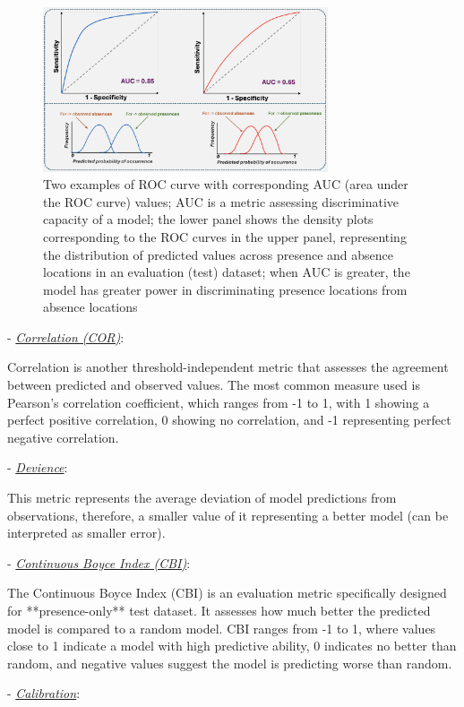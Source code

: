 \documentclass[
]{article}
\begin{document}
\begin{mdframed}[backgroundcolor=gray!10, linecolor=black!75, linewidth=2pt, roundcorner=5pt, shadow=true,frametitle={\textbf{BOX 2: \uline{Model evaluations for SDMs}}}]
\begin{figure}[H]
    \centering
    \includegraphics[width=0.75\textwidth]{roc.png}
    \caption{Two examples of ROC curve with corresponding AUC (area under the ROC curve) values; AUC is a metric assessing discriminative capacity of a model; the lower panel shows the density plots corresponding to the ROC curves in the upper panel, representing the distribution of predicted values across presence and absence locations in an evaluation (test) dataset; when AUC is greater, the model has greater power in discriminating presence locations from absence locations}
    \label{fig:Fig4}
\end{figure}

- \uline{\textit{Correlation (COR)}}: 

Correlation is another threshold-independent metric that assesses the agreement between predicted and observed values. The most common measure used is Pearson's correlation coefficient, which ranges from -1 to 1, with 1 showing a perfect positive correlation, 0 showing no correlation, and -1 representing perfect negative correlation.

- \uline{\textit{Devience}}: 

This metric represents the average deviation of model predictions from observations, therefore, a smaller value of it representing a better model (can be interpreted as smaller error).

- \uline{\textit{Continuous Boyce Index (CBI)}}: 

The Continuous Boyce Index (CBI) is an evaluation metric specifically designed for **presence-only** test dataset. It assesses how much better the predicted model is compared to a random model. CBI ranges from -1 to 1, where values close to 1 indicate a model with high predictive ability, 0 indicates no better than random, and negative values suggest the model is predicting worse than random.

- \uline{\textit{Calibration}}:


\end{mdframed}
\end{document}
